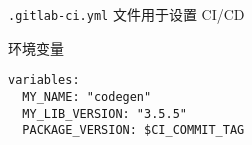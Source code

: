 
\verb`.gitlab-ci.yml` 文件用于设置 CI/CD

环境变量
\begin{lstlisting}[language=none]
variables:
  MY_NAME: "codegen"
  MY_LIB_VERSION: "3.5.5"
  PACKAGE_VERSION: $CI_COMMIT_TAG
\end{lstlisting}
